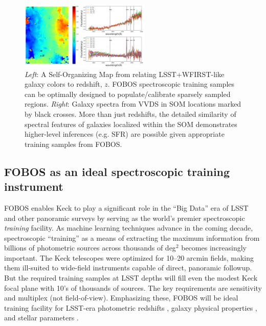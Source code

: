 
\begin{figure} %
\includegraphics[width=0.55\textwidth]{figs/Hemmati18_Fig8_VVDS_spec.png}
\caption{\small {\it Left}: A Self-Organizing Map
\citep[SOM;][]{1990Natur.346...24K} from \citet{hemmati18} relating
LSST+WFIRST-like galaxy colors to redshift, $z$. FOBOS spectroscopic
training samples can be optimally designed to populate/calibrate
sparsely sampled regions. {\it Right}: Galaxy spectra from VVDS
\citep{2005A&A...439..845L} in SOM locations marked by black crosses.
More than just redshifts, the detailed similarity of spectral
features of galaxies localized within the SOM demonstrates
higher-level inferences (e.g. SFR) are possible given appropriate
training samples from FOBOS.} \label{fig:SOM} \end{figure}

\subsection{FOBOS as an ideal spectroscopic training instrument}
\label{sec:datascience}

FOBOS enables Keck to play a significant role in the ``Big Data'' era
of LSST and other panoramic surveys by serving as the world's premier
spectroscopic \emph{training} facility. As machine learning
techniques advance in the coming decade, spectroscopic ``training''
as a means of extracting the maximum information from billions of
photometric sources across thousands of deg$^2$ becomes increasingly
important. The Keck telescopes were optimized for 10--20 arcmin
fields, making them ill-suited to wide-field instruments capable of
direct, panoramic followup. But the required training samples at LSST
depths will fill even the modest Keck focal plane with 10's of
thousands of sources. The key requirements are sensitivity and
multiplex (not field-of-view). Emphasizing these, FOBOS will be ideal
training facility for LSST-era photometric redshifts
\citep[see][]{salvato19}, galaxy physical properties
\citep[e.g.,][]{davidzon19}, and stellar parameters
\citep[e.g.,][]{2018arXiv180401530T}.

